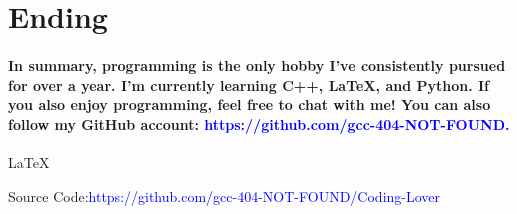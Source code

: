 \documentclass{article}
\begin{document}
\section{Ending}
\paragraph{\hspace{2em}In summary, programming is the only hobby I’ve consistently pursued for over a year. I’m currently learning C++, LaTeX, and Python. If you also enjoy programming, feel free to chat with me! You can also follow my GitHub account: \textcolor{blue}{https://github.com/gcc-404-NOT-FOUND.}}
\begin{center}
\Huge{\LaTeX}\par
\Large{Source Code:\textcolor{blue}{https://github.com/gcc-404-NOT-FOUND/Coding-Lover}}
\end{center}
\end{document}
